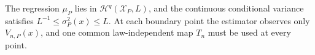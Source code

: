 The regression \(\mu_P\) lies in \(\mathcal H^q(\mathcal X_P,L)\), and the continuous conditional variance satisfies \(L^{-1}\leq\sigma_P^2(x)\leq L\).  At each boundary point the estimator observes only \(V_{n,P}(x)\), and one common law-independent map \(T_n\) must be used at every point.